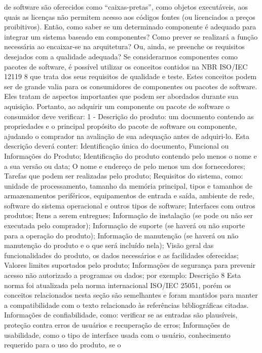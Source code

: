 de software são oferecidos como “caixas-pretas”, como objetos executáveis, aos
quais as licenças não permitem acesso aos códigos fontes (ou licenciados a preços
proibitivos). Então, como saber se um determinado componente é adequado para
integrar um sistema baseado em componentes? Como prever se realizará a função
necessária ao encaixar-se na arquitetura? Ou, ainda, se preenche os requisitos
desejados com a qualidade adequada?
Se considerarmos componentes como pacotes de software, é possível utilizar os
conceitos contidos na NBR ISO/IEC 12119 8 que trata dos seus requisitos de
qualidade e teste. Estes conceitos podem ser de grande valia para os consumidores
de componentes ou pacotes de software. Eles tratam de aspectos importantes que
podem ser abordados durante sua aquisição. Portanto, ao adquirir um componente
ou pacote de software o consumidor deve verificar:
1 - Descrição do produto: um documento contendo as propriedades e o
principal propósito do pacote de software ou componente, ajudando o
comprador na avaliação de sua adequação antes de adquiri-lo. Esta
descrição deverá conter:
Identificação única do documento,
Funcional ou Informações do Produto;
Identificação do produto contendo pelo menos o nome e a sua
versão ou data;
O nome e endereço de pelo menos um dos fornecedores;
Tarefas que podem ser realizadas pelo produto;
Requisitos do sistema, como: unidade de processamento, tamanho
da memória principal, tipos e tamanhos de armazenamentos
periféricos, equipamentos de entrada e saída, ambiente de rede,
software do sistema operacional e outros tipos de software;
Interfaces com outros produtos;
Itens a serem entregues;
Informação de instalação (se pode ou não ser executada pelo
comprador);
Informação de suporte (se haverá ou não suporte para a operação
do produto);
Informação de manutenção (se haverá ou não manutenção do
produto e o que será incluído nela);
Visão geral das funcionalidades do produto, os dados necessários e
as facilidades oferecidas;
Valores limites suportados pelo produto;
Informações de segurança para prevenir acesso não autorizado a
programas ou dados;
por
exemplo:
Descrição
8
Esta norma foi atualizada pela norma internacional ISO/IEC 25051, porém os conceitos relacionados
nesta seção são semelhantes e foram mantidos para manter a compatibilidade com o texto
relacionado às referências bibliográficas citadas.
Informações de confiabilidade, como: verificar se as entradas são
plausíveis, proteção contra erros de usuários e recuperação de
erros;
Informações de usabilidade, como o tipo de interface usada com o
usuário, conhecimento requerido para o uso do produto, se o
